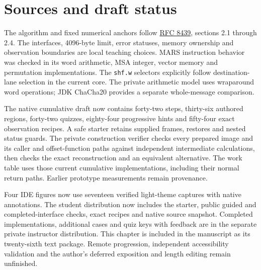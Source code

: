 \section{Sources and draft status}
The algorithm and fixed numerical anchors follow
\href{https://www.rfc-editor.org/rfc/rfc8439.html}{RFC 8439}, sections 2.1 through 2.4.
The interfaces, 4096-byte limit, error statuses, memory ownership and observation
boundaries are local teaching choices. MARS instruction behavior was checked in its
word arithmetic, MSA integer, vector memory and permutation implementations. The
\texttt{shf.w} selectors explicitly follow destination-lane selection in the current
core. The private arithmetic model uses wraparound word operations; JDK ChaCha20
provides a separate whole-message comparison.

The native cumulative draft now contains forty-two steps, thirty-six authored
regions, forty-two quizzes, eighty-four progressive hints and fifty-four exact
observation recipes. A safe starter retains supplied frames, restores and nested
status guards. The private construction verifier checks every prepared image and
its caller and offset-function paths against independent intermediate calculations,
then checks the exact reconstruction and an equivalent alternative. The work table
uses those current cumulative implementations, including their normal return paths.
Earlier prototype measurements remain provenance.

Four IDE figures now use seventeen verified light-theme captures with native annotations.
The student distribution now includes the starter, public guided and completed-interface
checks, exact recipes and native source snapshot. Completed implementations, additional
cases and quiz keys with feedback are in the separate private instructor distribution.
This chapter is included in the manuscript as its twenty-sixth text package.
Remote progression, independent accessibility validation and the author's deferred
exposition and length editing remain unfinished.
